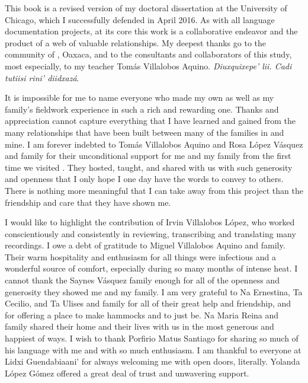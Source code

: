 \begin{refsection}

This book is a revised version of my doctoral dissertation at the University of Chicago, which I successfully defended in April 2016. As with all language documentation projects, at its core this work is a collaborative endeavor and the product of a web of valuable relationships. My deepest thanks go to the community of , Oaxaca, and to the consultants and collaborators of this study, most especially, to my teacher Tom\'{a}s Villalobos Aquino. \textit{Diuxquixepe’ lii. Cadi tutiisi rini’ diidxaz\'{a}}. 

It is impossible for me to name everyone who made my own as well as my family’s fieldwork experience in  such a rich and rewarding one. Thanks and appreciation cannot capture everything that I have learned and gained from the many relationships that have been built between many of the families in  and mine. I am forever indebted to Tom\'{a}s Villalobos Aquino and Rosa L\'{o}pez V\'{a}squez and family for their unconditional support for me and my family from the first time we visited . They hosted, taught, and shared with us with such generosity and openness that I only hope I one day have the words to convey to others. There is nothing more meaningful that I can take away from this project than the friendship and care that they have shown me.

I would like to highlight the contribution of Irvin Villalobos L\'{o}pez, who worked conscientiously and consistently in reviewing, transcribing and translating many recordings. I owe a debt of gratitude to Miguel Villalobos Aquino and family. Their warm hospitality and enthusiasm for all things were infectious and a wonderful source of comfort, especially during so many months of intense heat. I cannot thank the Saynes V\'{a}squez family enough for all of the openness and generosity they showed me and my family. I am very grateful to Na Ernestina, Ta Cecilio, and Ta Ulises and family for all of their great help and friendship, and for offering a place to make hammocks and to just be. Na Maria Reina and family shared their home and their lives with us in the most generous and happiest of ways. I wish to thank Porfirio Matus Santiago for sharing so much of his language with me and with so much enthusiasm. I am thankful to everyone at Lidxi Guendabiaani’ for always welcoming me with open doors, literally. Yolanda L\'{o}pez G\'{o}mez offered a great deal of trust and unwavering support. 


\end{refsection}
